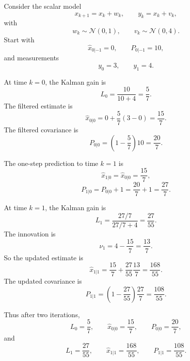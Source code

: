 \begin{eg}
	Consider the scalar model
	\[
		x_{k+1}=x_k+w_k,
		\qquad
		y_k=x_k+v_k,
	\]
	with
	\[
		w_k \sim \mathcal{N}(0,1),
		\qquad
		v_k \sim \mathcal{N}(0,4).
	\]
	Start with
	\[
		\hat x_{0|-1}=0,
		\qquad
		P_{0|-1}=10,
	\]
	and measurements
	\[
		y_0=3,
		\qquad
		y_1=4.
	\]

	At time $k=0$, the Kalman gain is
	\[
		L_0 = \frac{10}{10+4}=\frac{5}{7}.
	\]
	The filtered estimate is
	\[
		\hat x_{0|0}
		=
		0+\frac{5}{7}(3-0)
		=
		\frac{15}{7}.
	\]
	The filtered covariance is
	\[
		P_{0|0}
		=
		\left(1-\frac{5}{7}\right)10
		=
		\frac{20}{7}.
	\]

	The one-step prediction to time $k=1$ is
	\[
		\hat x_{1|0}=\hat x_{0|0}=\frac{15}{7},
	\]
	\[
		P_{1|0}=P_{0|0}+1=\frac{20}{7}+1=\frac{27}{7}.
	\]

	At time $k=1$, the Kalman gain is
	\[
		L_1
		=
		\frac{27/7}{27/7+4}
		=
		\frac{27}{55}.
	\]
	The innovation is
	\[
		\nu_1 = 4-\frac{15}{7}=\frac{13}{7}.
	\]
	So the updated estimate is
	\[
		\hat x_{1|1}
		=
		\frac{15}{7}+\frac{27}{55}\frac{13}{7}
		=
		\frac{168}{55}.
	\]
	The updated covariance is
	\[
		P_{1|1}
		=
		\left(1-\frac{27}{55}\right)\frac{27}{7}
		=
		\frac{108}{55}.
	\]

	Thus after two iterations,
	\[
		L_0=\frac{5}{7},
		\qquad
		\hat x_{0|0}=\frac{15}{7},
		\qquad
		P_{0|0}=\frac{20}{7},
	\]
	and
	\[
		L_1=\frac{27}{55},
		\qquad
		\hat x_{1|1}=\frac{168}{55},
		\qquad
		P_{1|1}=\frac{108}{55}.
	\]
\end{eg}
